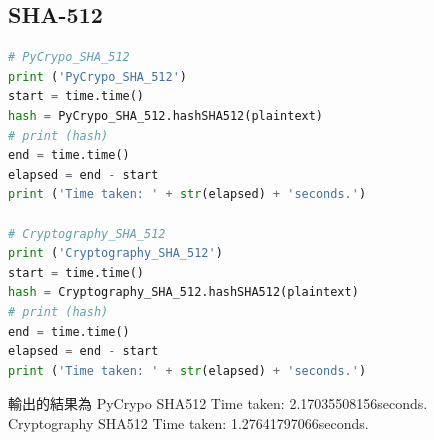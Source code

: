 \documentclass[12pt,a4paper]{article}
\begin{document}
\subsection{SHA-512}
{
\begin{lstlisting}[language=Python]
# PyCrypo_SHA_512
print ('PyCrypo_SHA_512')
start = time.time()
hash = PyCrypo_SHA_512.hashSHA512(plaintext)
# print (hash)
end = time.time()
elapsed = end - start
print ('Time taken: ' + str(elapsed) + 'seconds.')

# Cryptography_SHA_512
print ('Cryptography_SHA_512')
start = time.time()
hash = Cryptography_SHA_512.hashSHA512(plaintext)
# print (hash)
end = time.time()
elapsed = end - start
print ('Time taken: ' + str(elapsed) + 'seconds.')	
\end{lstlisting}
輸出的結果為
\newline PyCrypo SHA512
Time taken: 2.17035508156seconds.
\newline Cryptography SHA512
Time taken: 1.27641797066seconds.
}
\end{document}
